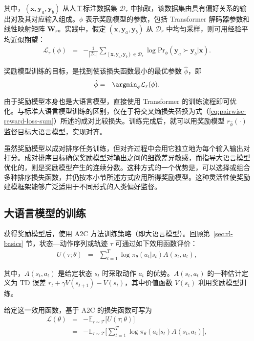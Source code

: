 \noindent 其中，$(\mathbf{x},\mathbf{y}_a,\mathbf{y}_b)$ 从人工标注数据集 $\mathcal{D}_r$ 中抽取，该数据集由具有偏好关系的输出对及其对应输入组成。$\phi$ 表示奖励模型的参数，包括 Transformer 解码器参数和线性映射矩阵 $\mathbf{W}_r$。实践中，假定 $(\mathbf{x},\mathbf{y}_a,\mathbf{y}_b)$ 从 $\mathcal{D}_r$ 中均匀采样，则可用经验平均近似期望：
\begin{eqnarray}
\mathcal{L}_r(\phi) & = & -\frac{1}{|\mathcal{D}_r|} \sum_{(\mathbf{x},\mathbf{y}_a,\mathbf{y}_b) \in \mathcal{D}_r} \log \mathrm{Pr}_{\phi}(\mathbf{y}_a \succ \mathbf{y}_b | \mathbf{x}). \label{eq:pairwise-reward-loss-sum}
\end{eqnarray}

奖励模型训练的目标，是找到使该损失函数最小的最优参数 $\hat{\phi}$，即
\begin{eqnarray}
\hat{\phi} & = & \argmin_{\phi} \mathcal{L}_r(\phi).
\end{eqnarray}

\noindent 由于奖励模型本身也是大语言模型，直接使用 Transformer 的训练流程即可优化。与标准大语言模型训练的区别，仅在于将交叉熵损失替换为式（\ref{eq:pairwise-reward-loss-sum}）所述的成对比较损失。训练完成后，就可以用奖励模型 $r_{\hat{\phi}}(\cdot)$ 监督目标大语言模型，实现对齐。

虽然奖励模型以成对排序任务训练，但对齐过程中会用它独立地为每个输入输出对打分。成对排序目标确保奖励模型对输出之间的细微差异敏感，而指导大语言模型优化的，则是奖励模型产生的连续分数。这种方式的一个优势是，可以选择或组合多种排序损失函数，并仍按本小节所述方式应用所得奖励模型。这种灵活性使奖励建模框架能够广泛适用于不同形式的人类偏好监督。

\subsection{大语言模型的训练}
\label{sec:rlhf-training-llms}

\noindent 获得奖励模型后，使用 A2C 方法训练策略（即大语言模型）。回顾第~\ref{sec:rl-basics} 节，状态—动作序列或轨迹 $\tau$ 可通过如下效用函数评价：
\begin{eqnarray}
U(\tau;\theta) & = &  \sum_{t=1}^{T} \log \pi_{\theta}(a_t|s_t) A(s_t,a_t), \label{eq:utility-basic-form}
\end{eqnarray}

\noindent 其中，$A(s_t,a_t)$ 是给定状态 $s_t$ 时采取动作 $a_t$ 的优势。$A(s_t,a_t)$ 的一种估计定义为 TD 误差 $ r_t + \gamma V(s_{t+1}) - V(s_t)$，其中价值函数 $V(s_t)$ 利用奖励模型训练。

给定这一效用函数，基于 A2C 的损失函数可写为
\begin{eqnarray}
\mathcal{L}(\theta) & = & -\mathbb{E}_{\tau \sim \mathcal{T}} \big[U(\tau;\theta) \big] \nonumber \\
          & = & -\mathbb{E}_{\tau \sim \mathcal{T}} \big[ \sum_{t=1}^{T} \log \pi_{\theta}(a_t|s_t) A(s_t,a_t) \big],
\end{eqnarray}

